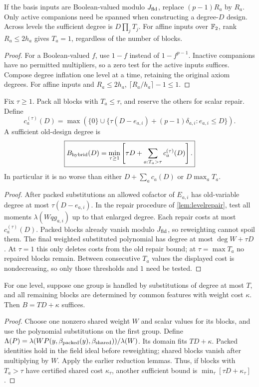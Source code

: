 \begin{corollary}\label{cor:packingvariants}
If the basis inputs are Boolean-valued modulo $J_{\mathrm{fld}}$, replace $(p-1)R_a$ by $R_a$. Only active companions need be spanned when constructing a degree-$D$ design. Across levels the sufficient degree is $D\prod_jT_j$. For affine inputs over $\mathbb F_2$, rank $R_a\le2h_a$ gives $T_a=1$, regardless of the number of blocks.
\end{corollary}
\begin{proof}
For a Boolean-valued $f$, use $1-f$ instead of $1-f^{p-1}$. Inactive companions have no permitted multipliers, so a zero test for the active inputs suffices. Compose degree inflation one level at a time, retaining the original axiom degrees. For affine inputs and $R_a\le2h_a$, $\lceil R_a/h_a\rceil-1\le1$.
\end{proof}

\begin{lemma}\label{lem:hybrid}
Fix $\tau\ge1$. Pack all blocks with $T_a\le\tau$, and reserve the others for scalar repair. Define
\[
 c_a^{(\tau)}(D)=\max\left(\{0\}\cup
 \{\tau(D-e_{a,i})+(p-1)\delta_{a,i}:e_{a,i}\le D\}\right).
\]
A sufficient old-design degree is
\[
 \boxed{B_{\rm hybrid}(D)=
 \min_{\tau\ge1}\left[\tau D+\sum_{a:T_a>\tau}c_a^{(\tau)}(D)\right].}
\]
In particular it is no worse than either $D+\sum_ac_a(D)$ or $D\max_aT_a$.
\end{lemma}
\begin{proof}
After packed substitutions an allowed cofactor of $E_{a,i}$ has old-variable degree at most $\tau(D-e_{a,i})$. In the repair procedure of \cref{lem:levelrepair}, test all moments $\lambda(Wqg_{a,i})$ up to that enlarged degree. Each repair costs at most $c_a^{(\tau)}(D)$. Packed blocks already vanish modulo $J_{\mathrm{fld}}$, so reweighting cannot spoil them. The final weighted substituted polynomial has degree at most $\deg W+\tau D$. At $\tau=1$ this only deletes costs from the old repair bound; at $\tau=\max T_a$ no repaired blocks remain. Between consecutive $T_a$ values the displayed cost is nondecreasing, so only those thresholds and $1$ need be tested.
\end{proof}

\begin{lemma}\label{lem:sharedhybrid}
For one level, suppose one group is handled by substitutions of degree at most $T$, and all remaining blocks are determined by common features with weight cost $\kappa$. Then $B=TD+\kappa$ suffices.
\end{lemma}
\begin{proof}
Choose one nonzero shared weight $W$ and scalar values for its blocks, and use the polynomial substitutions on the first group. Define
$\Lambda(P)=\lambda(WP(y,\beta_{\rm packed}(y),\beta_{\rm shared}))/\lambda(W)$.
Its domain fits $TD+\kappa$. Packed identities hold in the field ideal before reweighting; shared blocks vanish after multiplying by $W$. Apply the earlier reduction lemmas. Thus, if blocks with $T_a>\tau$ have certified shared cost $\kappa_\tau$, another sufficient bound is $\min_\tau[\tau D+\kappa_\tau]$.
\end{proof}

